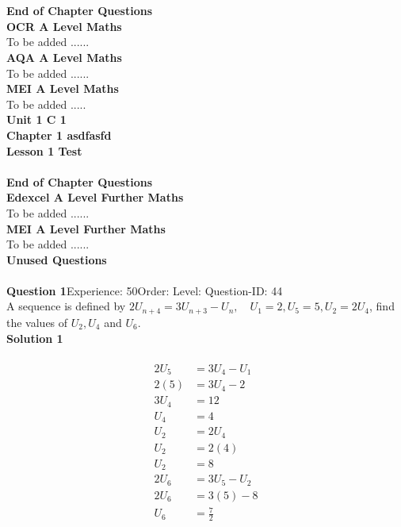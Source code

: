 \documentclass{article}
\begin{document}
\\[4pt]
\\[2pt]
\noindent\large{\textbf{End of Chapter Questions}}\\[15pt]
\noindent\Huge{\textbf{OCR A Level Maths}}\\[5pt]
\noindent\large{To be added ......}\\[20pt]
\noindent\Huge{\textbf{AQA A Level Maths}}\\[5pt]
\noindent\large{To be added ......}\\[20pt]
\noindent\Huge{\textbf{MEI A Level Maths}}\\[5pt]
\noindent\large{To be added .....}\\[20pt]
\noindent\huge{\textbf{Unit 1 C 1}}\\[18pt]
\noindent\huge{\textbf{Chapter 1 asdfasfd}}\\[15pt]
\noindent\huge{\textbf{Lesson 1 Test }}\\[12pt]
\\[2pt]
\noindent\large{\textbf{End of Chapter Questions}}\\[15pt]
\noindent\Huge{\textbf{Edexcel A Level Further Maths}}\\[5pt]
\noindent\large{To be added ......}\\[20pt]
\noindent\Huge{\textbf{MEI A Level Further Maths}}\\[5pt]
\noindent\large{To be added ......}\\[20pt]
\noindent\Huge{\textbf{Unused Questions}}\\[10pt]
\noindent\large{}\\\noindent\textbf{Question 1}\hspace{20pt}Experience: 50\hspace{20pt}Order: \hspace{20pt}Level: \hspace{20pt}Question-ID: 44\\[2pt]
A sequence is defined by $2U_{n+4}=3U_{n+3}-U_n, \quad U_1=2,U_5=5, U_2=2U_4$, find the values of $U_2,U_4$ and $U_6$.\\[4pt]
\noindent\textbf{Solution 1}\\[2pt]
\\[-35pt]\begin{align*}
2U_5&=3U_4-U_1\\[2pt]
2(5)&=3U_4-2\\[2pt]
3U_4&=12\\[2pt]
U_4&=4\\[12pt]
U_2&=2U_4\\[2pt]
U_2&=2(4)\\[2pt]
U_2&=8\\[12pt]
2U_6&=3U_5-U_2\\[2pt]
2U_6&=3(5)-8\\[2pt]
U_6&=\displaystyle\frac{7}{2}\\
\end{align*}
\end{document}
